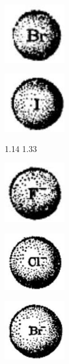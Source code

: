 \documentclass[10pt]{article}
\begin{document}
\begin{center}
\includegraphics[max width=0.2\textwidth]{images/01912d0f-097c-7e75-8f32-4f326cd86c9f_47_196612.jpg}
\end{center}

\begin{center}
\includegraphics[max width=0.2\textwidth]{images/01912d0f-097c-7e75-8f32-4f326cd86c9f_47_881999.jpg}
\end{center}

1.14 1.33

\begin{center}
\includegraphics[max width=0.2\textwidth]{images/01912d0f-097c-7e75-8f32-4f326cd86c9f_47_511057.jpg}
\end{center}

\begin{center}
\includegraphics[max width=0.2\textwidth]{images/01912d0f-097c-7e75-8f32-4f326cd86c9f_47_995315.jpg}
\end{center}

\begin{center}
\includegraphics[max width=0.2\textwidth]{images/01912d0f-097c-7e75-8f32-4f326cd86c9f_47_752852.jpg}
\end{center}
\end{document}
